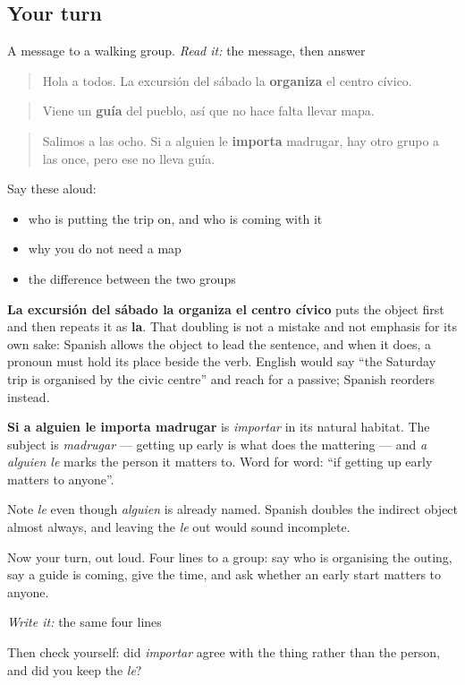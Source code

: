 \subsection*{Your turn}
A message to a walking group. \emph{Read it:} the message, then answer

\begin{quote}
Hola a todos. La excursión del sábado la \textbf{organiza} el centro cívico.
\end{quote}

\begin{quote}
Viene un \textbf{guía} del pueblo, así que no hace falta llevar mapa.
\end{quote}

\begin{quote}
Salimos a las ocho. Si a alguien le \textbf{importa} madrugar, hay otro grupo a las once, pero ese no lleva guía.
\end{quote}

Say these aloud:

\begin{itemize}
\raggedright
  \item who is putting the trip on, and who is coming with it
  \item why you do not need a map
  \item the difference between the two groups
\end{itemize}

\begin{culture}
\textbf{La excursión del sábado la organiza el centro cívico} puts the object first and then repeats it as \textbf{la}. That doubling is not a mistake and not emphasis for its own sake: Spanish allows the object to lead the sentence, and when it does, a pronoun must hold its place beside the verb. English would say \textquotedblleft{}the Saturday trip is organised by the civic centre\textquotedblright{} and reach for a passive; Spanish reorders instead.

\textbf{Si a alguien le importa madrugar} is \emph{importar} in its natural habitat. The subject is \emph{madrugar} — getting up early is what does the mattering — and \emph{a alguien le} marks the person it matters to. Word for word: \textquotedblleft{}if getting up early matters to anyone\textquotedblright{}.

Note \emph{le} even though \emph{alguien} is already named. Spanish doubles the indirect object almost always, and leaving the \emph{le} out would sound incomplete.
\end{culture}

\begin{tcolorbox}[breakable,colback=teal!4,colframe=teal!35!black,title={Before you move on}]
Now your turn, out loud. Four lines to a group: say who is organising the outing, say a guide is coming, give the time, and ask whether an early start matters to anyone.

\emph{Write it:} the same four lines

Then check yourself: did \emph{importar} agree with the thing rather than the person, and did you keep the \emph{le}?
\end{tcolorbox}
